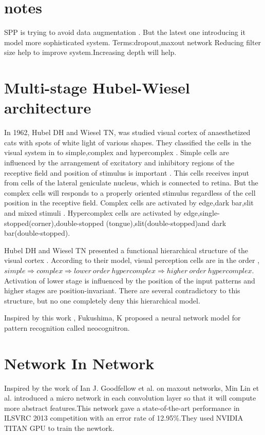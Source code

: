 \documentclass{article}
\begin{document}
\section{notes}
SPP is trying to avoid data augmentation . But the latest one introducing it model more sophisticated system.
Terms:dropout,maxout network
Reducing filter size help to improve system.Increasing depth will help. 
\section{Multi-stage Hubel-Wiesel architecture}
In 1962, Hubel DH and Wiesel TN\cite{Hubel1962},\cite{Hubel1965a} was studied visual cortex of anaesthetized cats  with   spots of white light of various shapes. They classified the  cells in the visual system in to  simple,complex and hypercomplex . Simple cells are influenced  by the arrangement of  excitatory and inhibitory regions of the receptive field and  position of stimulus is important . This cells receives input from cells of the lateral geniculate nucleus, which is connected to retina. But the complex cells will responds to  a properly  oriented stimulus regardless of the cell position in the receptive field. Complex cells are activated by edge,dark bar,slit and mixed stimuli . Hypercomplex cells are activated by edge,single-stopped(corner),double-stopped (tongue),slit(double-stopped)and dark bar(double-stopped).

\par Hubel DH and Wiesel TN \cite{Hubel1965a} presented a functional hierarchical structure of the visual cortex . According to their model, visual perception cells are in the  order , $simple\Longrightarrow complex\Longrightarrow lower \ order  \ hypercomplex  \Longrightarrow higher \ order \ hypercomplex$. Activation of  lower stage is  influenced by  the position of the input patterns and  higher stages are  position-invariant. There are several  contradictory to this structure, but no one   completely deny this hierarchical model.
\par Inspired by this work  , Fukushima, K \cite{Stark1980} proposed a neural network model for pattern recognition called neocognitron.













\section{Network In Network }
Inspired by the work of Ian J. Goodfellow et al.\cite{Goodfellow2013} on maxout networks,  Min Lin et al.\cite{Lin2013} introduced a micro network in each convolution layer so that it will compute more abstract features.This network gave a state-of-the-art performance in  ILSVRC 2013 competition with an error rate of 12.95\%.They used NVIDIA TITAN GPU to train the newtork.
\end{document}
